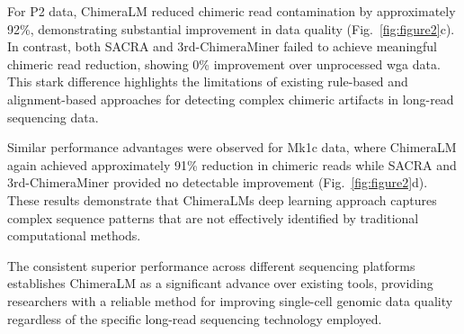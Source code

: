 \documentclass[pdflatex,sn-nature]{sn-jnl}%
\theoremstyle{thmstyleone}%
\theoremstyle{thmstyletwo}%
\theoremstyle{thmstylethree}%
\begin{document}
For P2 data, ChimeraLM reduced chimeric read contamination by approximately 92\%, demonstrating substantial improvement in data quality (Fig.~\ref{fig:figure2}c).
In contrast, both SACRA and 3rd-ChimeraMiner failed to achieve meaningful chimeric read reduction, showing 0\% improvement over unprocessed \gls{wga} data.
This stark difference highlights the limitations of existing rule-based and alignment-based approaches for detecting complex chimeric artifacts in long-read sequencing data.

Similar performance advantages were observed for Mk1c data, where ChimeraLM again achieved approximately 91\% reduction in chimeric reads while SACRA and 3rd-ChimeraMiner provided no detectable improvement (Fig.~\ref{fig:figure2}d).
These results demonstrate that ChimeraLM\textquotesingle s deep learning approach captures complex sequence patterns that are not effectively identified by traditional computational methods.

The consistent superior performance across different sequencing platforms establishes ChimeraLM as a significant advance over existing tools, providing researchers with a reliable method for improving single-cell genomic data quality regardless of the specific long-read sequencing technology employed.
\end{document}

